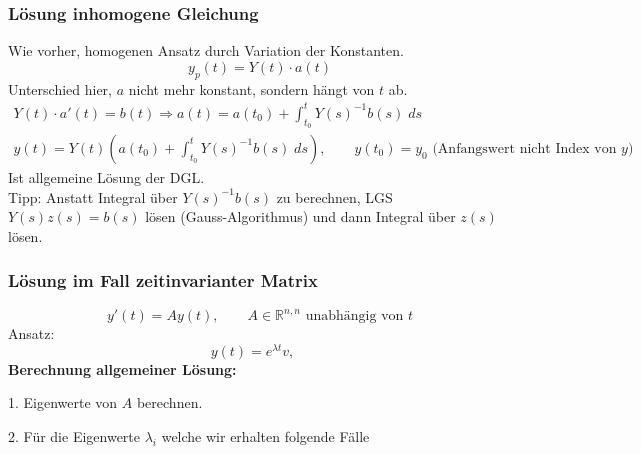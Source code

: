 \documentclass[a4paper]{article}
\newcommand{\R}{\mathbb{R}}
\begin{document}
\subsubsection{Lösung inhomogene Gleichung}
Wie vorher, homogenen Ansatz durch Variation der Konstanten.
\[
	y_p (t) = Y(t) \cdot a(t)
\]
Unterschied hier, $a$ nicht mehr konstant, sondern hängt von $t$ ab.
\begin{gather*}
	Y(t) \cdot a' (t) = b(t)
	\Rightarrow a(t) = a(t_0) +
	\int_{t_0}^{t} Y (s) ^{-1} b(s) \; ds \\
	y(t) = Y(t) \left(
		a(t_0) + 
		\int_{t_0}^{t} Y (s)^{-1}  b(s) \; ds
	\right), \qquad
	y(t_0) = y_0
	\text{ (Anfangswert nicht Index von $y$) }
\end{gather*}
Ist allgemeine Lösung der DGL.
\\

Tipp: Anstatt Integral über $Y(s) ^{-1} b(s)$ zu berechnen, LGS
$Y(s)z(s) = b(s)$ lösen (Gauss-Algorithmus) und dann Integral über
$z(s)$ lösen.

\subsubsection{Lösung im Fall zeitinvarianter Matrix}
\[
	y'(t) = A y(t), \qquad
	A \in \R ^{n,n} \text{ unabhängig von $t$}
\]
Ansatz:
\[
	y(t) = e ^{\lambda t} v, \quad
\] 
\textbf{Berechnung allgemeiner Lösung:} 

1. Eigenwerte von $A$ berechnen.

2. Für die Eigenwerte $\lambda_i$ welche wir erhalten folgende
Fälle 
\end{document}
